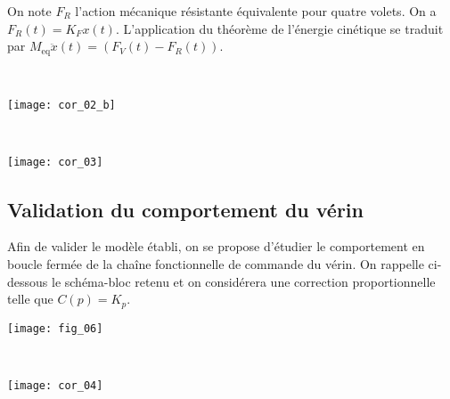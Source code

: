 On note $F_R$ l'action mécanique résistante équivalente pour quatre volets. On a $F_R(t) = K_F x(t)$. L'application du théorème de l'énergie cinétique se traduit par $M_{\text{eq}}\ddot{x}(t)=\left(F_V(t)-F_R(t)\right)$. 
\fi

\ifprof
\begin{corrige} ~\\
\begin{center}
\texttt{[image: cor\_02\_b]}
\end{center}
\end{corrige}
\else
\fi

\ifprof
\begin{corrige} ~\\
\begin{center}
\texttt{[image: cor\_03]}
\end{center}
\end{corrige}
\else
\fi

\subsection*{Validation du comportement du vérin} 

\ifprof
\else

Afin de valider le modèle établi, on se propose d'étudier le comportement en boucle fermée de la chaîne fonctionnelle de commande du vérin. On rappelle ci-dessous le schéma-bloc retenu et on considérera une correction proportionnelle telle que  $C(p)=K_p$.

\begin{center}
\texttt{[image: fig\_06]}
\end{center}
\fi

\ifprof
\begin{corrige} ~\\
\begin{center}
\texttt{[image: cor\_04]}
\end{center}
\end{corrige}
\else
\fi

